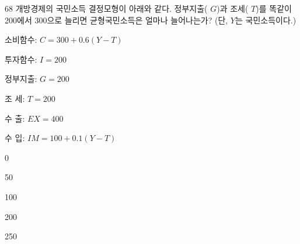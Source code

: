 \begin{question}{68}
개방경제의 국민소득 결정모형이 아래와 같다. 정부지출( $G$)과 조세( $T$)를 똑같이 200에서 300으로 늘리면 균형국민소득은 얼마나 늘어나는가? (단, $Y$는 국민소득이다.)
\begin{framedtext}
소비함수: $C=300+0.6(Y-T)$ \par
투자함수: $I=200$ \par
정부지출: $G=200$ \par
조 세: $T=200$ \par
수 출: $EX=400$ \par
수 입: $IM=100+0.1(Y-T)$ \par
\end{framedtext}
\begin{choices}
  \item 0
  \item 50
  \item 100
  \item 200
  \item 250
\end{choices}
\end{question}
